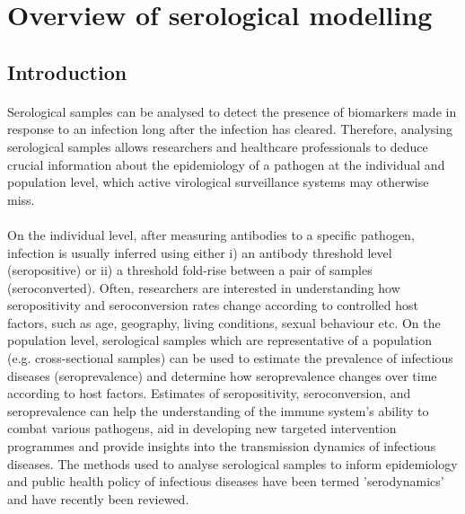 \section{Overview of serological modelling}

\subsection{Introduction}

\paragraph{}Serological samples can be analysed to detect the presence of biomarkers made in response to an infection long after the infection has cleared.\cite{Cutts2016-za} Therefore, analysing serological samples allows researchers and healthcare professionals to deduce crucial information about the epidemiology of a pathogen at the individual and population level, which active virological surveillance systems may otherwise miss.

\paragraph{}On the individual level, after measuring antibodies to a specific pathogen, infection is usually inferred using either i) an antibody threshold level (seropositive) or ii) a threshold fold-rise between a pair of samples (seroconverted).\cite{Haselbeck2022-ob} Often, researchers are interested in understanding how seropositivity and seroconversion rates change according to controlled host factors, such as age, geography, living conditions, sexual behaviour etc.\cite{Dhar-Chowdhury2017-yi, Wansom2021-jh, Crawford2006-wt} On the population level, serological samples which are representative of a population (e.g. cross-sectional samples) can be used to estimate the prevalence of infectious diseases (seroprevalence) and determine how seroprevalence changes over time according to host factors.\cite{Chan2021-me,Van_den_Berg2023-pl,Colton2021-bt} Estimates of seropositivity, seroconversion, and seroprevalence can help the understanding of the immune system's ability to combat various pathogens, aid in developing new targeted intervention programmes and provide insights into the transmission dynamics of infectious diseases. The methods used to analyse serological samples to inform epidemiology and public health policy of infectious diseases have been termed 'serodynamics' and have recently been reviewed.\cite{Hay2023-ty}

